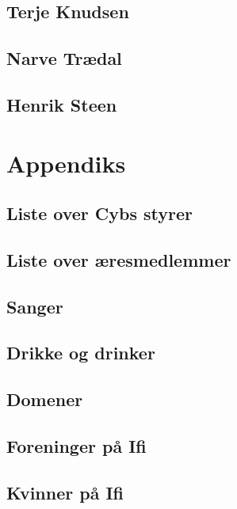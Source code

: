 \documentclass[12pt, a4paper]{book}
\begin{document}
\chapter{Terje Knudsen}
\chapter{Narve Trædal}
\chapter{Henrik Steen}

\part{Appendiks}
\chapter*{Liste over Cybs styrer}
\chapter*{Liste over æresmedlemmer}
\chapter*{Sanger}
\chapter*{Drikke og drinker}
\chapter*{Domener}
\chapter*{Foreninger på Ifi}
\chapter*{Kvinner på Ifi}
\end{document}
